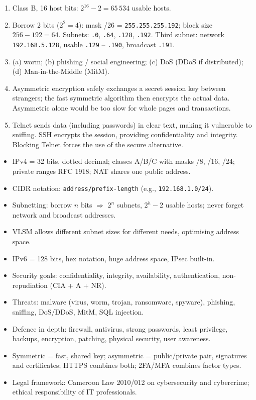 \documentclass[11pt]{article}
\begin{document}
\begin{corrige}[Exercise 1]
\begin{enumerate}
\item Class B, 16 host bits: $2^{16}-2 = 65\,534$ usable hosts.
\item Borrow 2 bits ($2^2 = 4$): mask /26 = \texttt{255.255.255.192}; block size $256-192 = 64$. Subnets: \texttt{.0}, \texttt{.64}, \texttt{.128}, \texttt{.192}. Third subnet: network \texttt{192.168.5.128}, usable \texttt{.129} -- \texttt{.190}, broadcast \texttt{.191}.
\item (a) worm; (b) phishing / social engineering; (c) DoS (DDoS if distributed); (d) Man-in-the-Middle (MitM).
\item Asymmetric encryption safely exchanges a secret session key between strangers; the fast symmetric algorithm then encrypts the actual data. Asymmetric alone would be too slow for whole pages and transactions.
\item Telnet sends data (including passwords) in clear text, making it vulnerable to sniffing. SSH encrypts the session, providing confidentiality and integrity. Blocking Telnet forces the use of the secure alternative.
\end{enumerate}
\end{corrige}

\begin{aretenir}
\begin{itemize}
\item IPv4 = 32 bits, dotted decimal; classes A/B/C with masks /8, /16, /24; private ranges RFC 1918; NAT shares one public address.
\item CIDR notation: \texttt{address/prefix-length} (e.g., \texttt{192.168.1.0/24}).
\item Subnetting: borrow $n$ bits $\Rightarrow$ $2^n$ subnets, $2^h - 2$ usable hosts; never forget network and broadcast addresses.
\item VLSM allows different subnet sizes for different needs, optimising address space.
\item IPv6 = 128 bits, hex notation, huge address space, IPsec built-in.
\item Security goals: confidentiality, integrity, availability, authentication, non-repudiation (CIA + A + NR).
\item Threats: malware (virus, worm, trojan, ransomware, spyware), phishing, sniffing, DoS/DDoS, MitM, SQL injection.
\item Defence in depth: firewall, antivirus, strong passwords, least privilege, backups, encryption, patching, physical security, user awareness.
\item Symmetric = fast, shared key; asymmetric = public/private pair, signatures and certificates; HTTPS combines both; 2FA/MFA combines factor types.
\item Legal framework: Cameroon Law 2010/012 on cybersecurity and cybercrime; ethical responsibility of IT professionals.
\end{itemize}
\end{aretenir}
\end{document}
